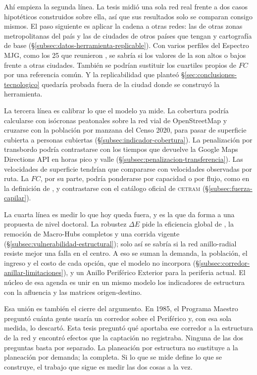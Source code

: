 Ahí empieza la segunda línea. La tesis midió una sola red real frente a dos
casos hipotéticos construidos sobre ella, así que sus resultados solo se
comparan consigo mismos. El paso siguiente es aplicar la cadena a otras redes:
las de otras zonas metropolitanas del país y las de ciudades de otros países
que tengan  \gtfs{} y cartografía de base
(§\ref{subsec:datos-herramienta-replicable}). Con varios perfiles del Espectro
MJG, como los 25 que reunieron \citet{kujala2018}, se sabría si los valores de
la \zmvm{} son altos o bajos frente a otras ciudades. También se podrían
sustituir los cuartiles propios de $FC$ por una referencia común. Y la
replicabilidad que planteó §\ref{sec:conclusiones-tecnologico} quedaría
probada fuera de la ciudad donde se construyó la herramienta.

La tercera línea es calibrar lo que el modelo ya mide. La cobertura podría
calcularse con isócronas peatonales sobre la red vial de OpenStreetMap y
cruzarse con la población por manzana del Censo 2020, para pasar de superficie
cubierta a personas cubiertas (§\ref{subsec:indicador-cobertura}). La
penalización por transbordo podría contrastarse con los tiempos que devuelve la
Google Maps Directions API en horas pico y valle
(§\ref{subsec:penalizacion-transferencia}). Las velocidades de superficie
tendrían que compararse con velocidades observadas por ruta. La $FC$, por su
parte, podría ponderarse por capacidad o por flujo, como en la definición de
\citet{lee2008}, y contrastarse con el catálogo oficial de \textsc{cetram}
(§\ref{subsec:fuerza-capilar}).

La cuarta línea es medir lo que hoy queda fuera, y es la que da forma a una
propuesta de nivel doctoral. La robustez $\Delta E$ pide la eficiencia global
de \citet{latora2001efficient}, la remoción de Macro-Hubs completos y una
corrida vigente (§\ref{subsec:vulnerabilidad-estructural}); solo así se sabría
si la red anillo-radial resiste mejor una falla en el centro. A eso se suman la
demanda, la población, el ingreso y el costo de cada opción, que el modelo no
incorpora (§\ref{subsec:corredor-anillar-limitaciones}), y un Anillo Periférico
Exterior para la periferia actual. El núcleo de esa agenda es unir en un mismo
modelo los indicadores de estructura con la afluencia y las matrices
origen-destino.

Esa unión es también el cierre del argumento. En 1985, el Programa Maestro
preguntó cuánta gente usaría un corredor sobre el Periférico y, con esa sola
medida, lo descartó. Esta tesis preguntó qué aportaba ese corredor a la
estructura de la red y encontró efectos que la captación no registraba. Ninguna
de las dos preguntas basta por separado. La planeación por estructura no
sustituye a la planeación por demanda; la completa. Si lo que se mide define lo
que se construye, el trabajo que sigue es medir las dos cosas a la vez.
